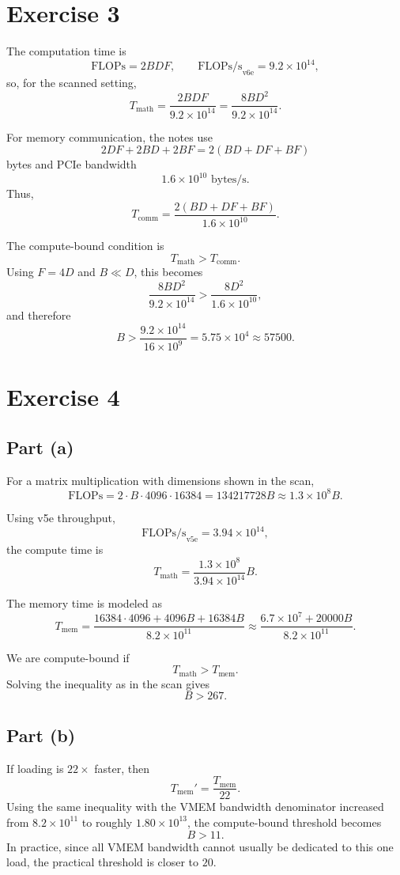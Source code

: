 \documentclass[11pt]{article}
\newcommand{\tmath}{T_{\mathrm{math}}}
\newcommand{\tcomm}{T_{\mathrm{comm}}}
\newcommand{\tmem}{T_{\mathrm{mem}}}
\begin{document}
\section*{Exercise 3}

The computation time is
\[
\mathrm{FLOPs} = 2BDF,
\qquad
\mathrm{FLOPs/s}_{\mathrm{v6e}} = 9.2 \times 10^{14},
\]
so, for the scanned setting,
\[
\tmath = \frac{2BDF}{9.2 \times 10^{14}}
       = \frac{8BD^2}{9.2 \times 10^{14}}.
\]

For memory communication, the notes use
\[
2DF + 2BD + 2BF = 2(BD + DF + BF)
\]
bytes and PCIe bandwidth
\[
1.6 \times 10^{10} \text{ bytes/s}.
\]
Thus,
\[
\tcomm
  =
  \frac{2(BD + DF + BF)}{1.6 \times 10^{10}}.
\]

The compute-bound condition is
\[
\tmath > \tcomm.
\]
Using $F = 4D$ and $B \ll D$, this becomes
\[
\frac{8BD^2}{9.2 \times 10^{14}}
  >
\frac{8D^2}{1.6 \times 10^{10}},
\]
and therefore
\[
B > \frac{9.2 \times 10^{14}}{16 \times 10^9}
  = 5.75 \times 10^4
  \approx 57500.
\]

\section*{Exercise 4}

\subsection*{Part (a)}

For a matrix multiplication with dimensions shown in the scan,
\[
\mathrm{FLOPs}
  =
  2 \cdot B \cdot 4096 \cdot 16384
  =
  134217728 B
  \approx 1.3 \times 10^8 B.
\]

Using v5e throughput,
\[
\mathrm{FLOPs/s}_{\mathrm{v5e}} = 3.94 \times 10^{14},
\]
the compute time is
\[
\tmath = \frac{1.3 \times 10^8}{3.94 \times 10^{14}} B.
\]

The memory time is modeled as
\[
\tmem
  =
  \frac{16384 \cdot 4096 + 4096B + 16384B}{8.2 \times 10^{11}}
  \approx
  \frac{6.7 \times 10^7 + 20000B}{8.2 \times 10^{11}}.
\]

We are compute-bound if
\[
\tmath > \tmem.
\]
Solving the inequality as in the scan gives
\[
B > 267.
\]

\subsection*{Part (b)}

If loading is $22\times$ faster, then
\[
\tmem' = \frac{\tmem}{22}.
\]
Using the same inequality with the VMEM bandwidth denominator increased from
$8.2 \times 10^{11}$ to roughly $1.80 \times 10^{13}$, the compute-bound
threshold becomes
\[
B > 11.
\]
In practice, since all VMEM bandwidth cannot usually be dedicated to this one
load, the practical threshold is closer to $20$.
\end{document}
